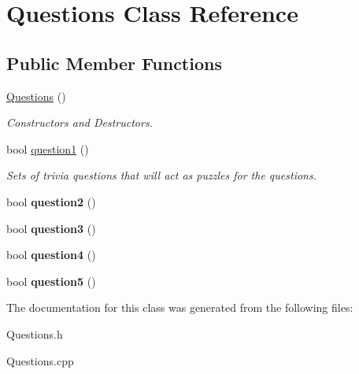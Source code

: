 \hypertarget{classQuestions}{
\section{Questions Class Reference}
\label{classQuestions}
}
\subsection*{Public Member Functions}
\begin{DoxyCompactItemize}
\item 
\hypertarget{classQuestions_aae4a14c3ca464658d3785d2ec2135738}{
\hyperlink{classQuestions_aae4a14c3ca464658d3785d2ec2135738}{Questions} ()}
\label{classQuestions_aae4a14c3ca464658d3785d2ec2135738}

\begin{DoxyCompactList}\small\item\em Constructors and Destructors. \item\end{DoxyCompactList}\item 
\hypertarget{classQuestions_a1135d6ad65f56683ce554cc61a626adc}{
bool \hyperlink{classQuestions_a1135d6ad65f56683ce554cc61a626adc}{question1} ()}
\label{classQuestions_a1135d6ad65f56683ce554cc61a626adc}

\begin{DoxyCompactList}\small\item\em Sets of trivia questions that will act as puzzles for the questions. \item\end{DoxyCompactList}\item 
\hypertarget{classQuestions_a2ebafdb5f4634bf58e2718204b72a53f}{
bool {\bfseries question2} ()}
\label{classQuestions_a2ebafdb5f4634bf58e2718204b72a53f}

\item 
\hypertarget{classQuestions_aa9627914f9ea06902260da5312e78d01}{
bool {\bfseries question3} ()}
\label{classQuestions_aa9627914f9ea06902260da5312e78d01}

\item 
\hypertarget{classQuestions_a91909be8ee41f313b2817664829246ef}{
bool {\bfseries question4} ()}
\label{classQuestions_a91909be8ee41f313b2817664829246ef}

\item 
\hypertarget{classQuestions_a68724329536e2878b92f91f5f2442357}{
bool {\bfseries question5} ()}
\label{classQuestions_a68724329536e2878b92f91f5f2442357}

\end{DoxyCompactItemize}


The documentation for this class was generated from the following files:\begin{DoxyCompactItemize}
\item 
Questions.h\item 
Questions.cpp\end{DoxyCompactItemize}
